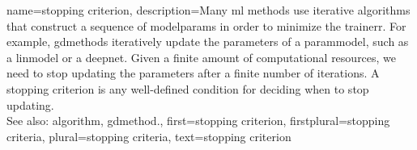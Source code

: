{name={stopping criterion},
	description={Many \gls{ml} methods use iterative \glspl{algorithm} 
		that construct a sequence of \glspl{modelparam} in order to minimize the \gls{trainerr}. 
		For example, \glspl{gdmethod} iteratively update the \glspl{parameter} of a \gls{parammodel}, 
		such as a \gls{linmodel} or a \gls{deepnet}. Given a finite amount of computational 
		resources, we need to stop updating the \glspl{parameter} after a finite number of \glspl{iteration}. 
		A stopping criterion is any well-defined condition for deciding when to stop updating.
				\\
		See also: \gls{algorithm}, \gls{gdmethod}.},
	first={stopping criterion},
	firstplural={stopping criteria},
	plural={stopping criteria}, 
	text={stopping criterion}
}

